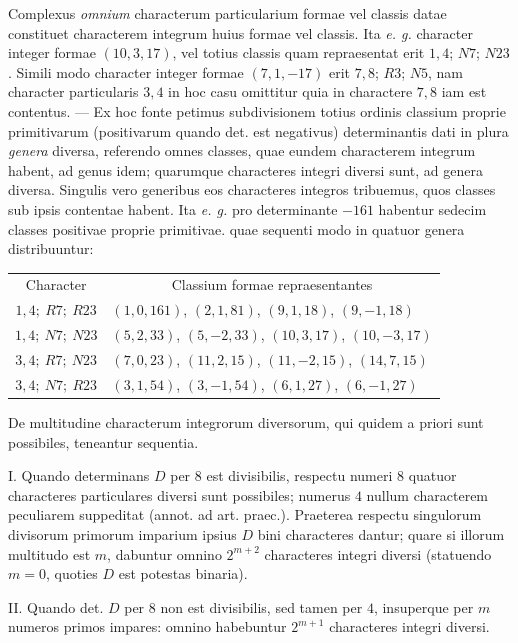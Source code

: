 Complexus \textit{omnium} characterum particularium formae vel classis datae constituet characterem integrum huius formae vel classis. Ita \textit{e. g.} character integer formae $(10,3,17)$, vel totius classis quam repraesentat erit $1,4$; $N7$; $N23$. Simili modo character integer formae $(7,1,-17)$ erit $7,8$; $R3$; $N5$, nam character particularis $3,4$ in hoc casu omittitur quia in charactere $7,8$ iam est contentus. --- Ex hoc fonte petimus subdivisionem totius ordinis classium proprie primitivarum (positivarum quando det. est negativus) determinantis dati in plura \textit{genera} diversa, referendo omnes classes, quae eundem characterem integrum habent, ad genus idem; quarumque characteres integri diversi sunt, ad genera diversa. Singulis vero generibus eos characteres integros tribuemus, quos classes sub ipsis contentae habent. Ita \textit{e. g.} pro determinante $-161$ habentur sedecim
classes positivae proprie primitivae. quae sequenti modo in quatuor genera distribuuntur:
\begin{center}
\begin{tabular}{c|l}
Character & \multicolumn{1}{c}{Classium formae repraesentantes} \\
$1,4;\ R7;\ R23$ & $(1,0,161)$, $(2,1,81)$, $(9,1,18)$, $(9,-1,18)$ \\
$1,4;\ N7;\ N23$ & $(5,2,33)$, $(5,-2,33)$, $(10,3,17)$, $(10,-3,17)$ \\
$3,4;\ R7;\ N23$ & $(7,0,23)$, $(11,2,15)$, $(11,-2,15)$, $(14,7,15)$ \\
$3,4;\ N7;\ R23$ & $(3,1,54)$, $(3,-1,54)$, $(6,1,27)$, $(6,-1,27)$
\end{tabular}
\end{center}

De multitudine characterum integrorum diversorum, qui quidem a priori sunt possibiles, teneantur sequentia.

I. Quando determinans $D$ per $8$ est divisibilis, respectu numeri $8$ quatuor characteres particulares diversi sunt possibiles; numerus $4$ nullum characterem peculiarem suppeditat (annot. ad art. praec.). Praeterea respectu singulorum divisorum primorum imparium ipsius $D$ bini characteres dantur; quare si illorum multitudo est $m$, dabuntur omnino $2^{m+2}$ characteres integri diversi (statuendo $m=0$, quoties $D$ est potestas binaria).

II. Quando det. $D$ per $8$ non est divisibilis, sed tamen per $4$, insuperque per $m$ numeros primos impares: omnino habebuntur $2^{m+1}$ characteres integri diversi.

